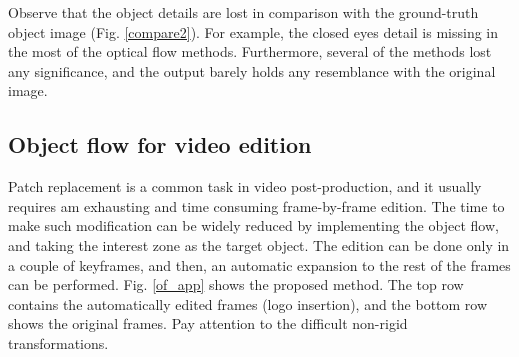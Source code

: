 Observe that the object details are lost in comparison with the ground-truth object image (Fig. \ref{compare2}). For example, the closed eyes detail is missing in the most of the optical 
flow methods. Furthermore, several of the methods lost any significance, and the output barely holds any resemblance with the original image.


\subsection{Object flow for video edition}

Patch replacement is a common task in video post-production, and it usually requires 
am exhausting and time consuming frame-by-frame edition. The time to make such modification can be 
widely reduced by implementing the object flow, and taking the interest zone as the target object. The edition can be done 
only in a couple of keyframes, and then, an automatic expansion to the rest of the frames can be performed. Fig. \ref{of_app} 
shows the proposed method. The top row contains the automatically edited frames (logo insertion), and the bottom row shows the 
original frames. Pay attention to the difficult non-rigid transformations.

